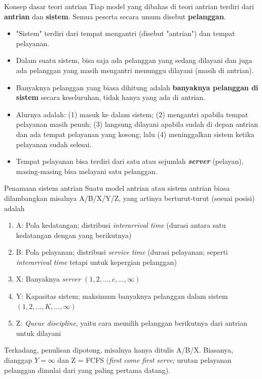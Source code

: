 \documentclass{beamer}
\newcommand{\pars}[1]{\left(#1\right)}
\begin{document}
\begin{frame}{Konsep dasar teori antrian}
    Tiap model yang dibahas di teori antrian terdiri dari \textbf{antrian} dan \textbf{sistem}. Semua peserta secara umum disebut \textbf{pelanggan}.
    \begin{itemize}
        \item "Sistem" terdiri dari tempat mengantri (disebut "antrian") dan tempat pelayanan.
        \item Dalam suatu sistem, bisa saja ada pelanggan yang sedang dilayani dan juga ada pelanggan yang masih mengantri menunggu dilayani (masih di antrian).
        \item Banyaknya pelanggan yang biasa dihitung adalah \textbf{banyaknya pelanggan di sistem} secara keseluruhan, tidak hanya yang ada di antrian.
        \item Alurnya adalah: (1) masuk ke dalam sistem; (2) mengantri apabila tempat pelayanan masih penuh; (3) langsung dilayani apabila sudah di depan antrian dan ada tempat pelayanan yang kosong; lalu (4) meninggalkan sistem ketika pelayanan sudah selesai.
        \item Tempat pelayanan bisa terdiri dari satu atau sejumlah \textbf{\textit{server}} (pelayan), masing-masing bisa melayani satu pelanggan.
    \end{itemize}
\end{frame}

\begin{frame}{Penamaan sistem antrian}
    Suatu model antrian atau sistem antrian biasa dilambangkan misalnya A/B/X/Y/Z, yang artinya berturut-turut (sesuai posisi) adalah
    \begin{enumerate}
        \item A: Pola kedatangan; distribusi \textit{interarrival time} (durasi antara satu kedatangan dengan yang berikutnya)
        \item B: Pola pelayanan; distribusi \textit{service time} (durasi pelayanan; seperti \textit{interarrival time} tetapi untuk kepergian pelanggan)
        \item X: Banyaknya \textit{server} \(\pars{1, 2, \dots, c, \dots, \infty}\)
        \item Y: Kapasitas sistem; maksimum banyaknya pelanggan dalam sistem \(\pars{1, 2, \dots, K, \dots, \infty}\)
        \item Z: \textit{Queue discipline}, yaitu cara memilih pelanggan berikutnya dari antrian untuk dilayani
    \end{enumerate}
    Terkadang, penulisan dipotong, misalnya hanya ditulis A/B/X. Biasanya, dianggap \(Y = \infty\) dan Z = FCFS (\textit{first come first serve;} urutan pelayanan pelanggan dimulai dari yang paling pertama datang).
\end{frame}
\end{document}
